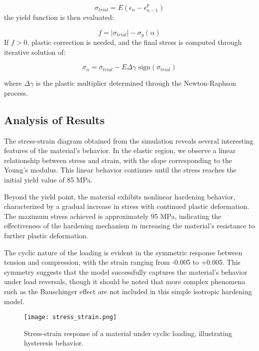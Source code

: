 \documentclass{article}
\begin{document}
$$ \sigma_{trial} = E(\epsilon_n - \epsilon^p_{n-1}) $$
the yield function is then evaluated:

$$ f = |\sigma_{trial}| - \sigma_y(\alpha) $$
If $f > 0$, plastic correction is needed, and the final stress is computed through iterative solution of:

$$ \sigma_n = \sigma_{trial} - E\Delta\gamma\text{ sign}(\sigma_{trial}) $$

where $\Delta\gamma$ is the plastic multiplier determined through the Newton-Raphson process.

\subsection{Analysis of Results}

The stress-strain diagram obtained from the simulation reveals several interesting features of the material's behavior. In the elastic region, we observe a linear relationship between stress and strain, with the slope corresponding to the Young's modulus. This linear behavior continues until the stress reaches the initial yield value of 85 MPa.

Beyond the yield point, the material exhibits nonlinear hardening behavior, characterized by a gradual increase in stress with continued plastic deformation. The maximum stress achieved is approximately 95 MPa, indicating the effectiveness of the hardening mechanism in increasing the material's resistance to further plastic deformation.

The cyclic nature of the loading is evident in the symmetric response between tension and compression, with the strain ranging from -0.005 to +0.005. This symmetry suggests that the model successfully captures the material's behavior under load reversals, though it should be noted that more complex phenomena such as the Bauschinger effect are not included in this simple isotropic hardening model.

\begin{figure}[h] %
    \centering %
    \texttt{[image: stress\_strain.png]} %
    \caption{Stress-strain response of a material under cyclic loading, illustrating hysteresis behavior.} %
    \label{fig:stress-strain} %
\end{figure}
\end{document}
